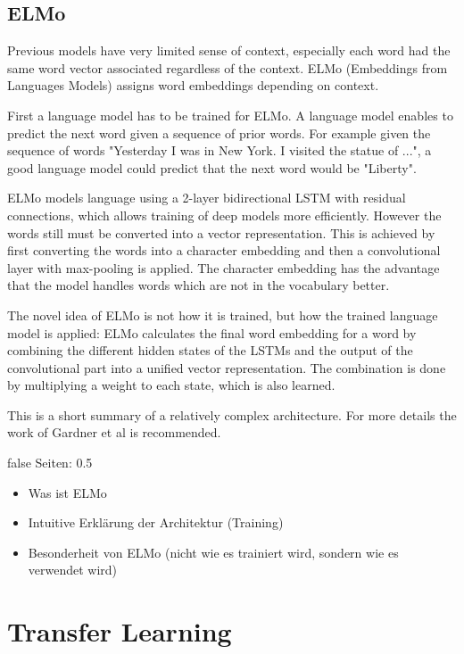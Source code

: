 \documentclass[draft,final,oneside]{vutinfth} %
\begin{document}
\fi

\subsection{ELMo \cite{elmo}}
Previous models have very limited sense of context, especially each word had the same word vector associated regardless of the context. ELMo (Embeddings from Languages Models) assigns word embeddings depending on context.

First a language model has to be trained for ELMo. A language model enables to predict the next word given a sequence of prior words. For example given the sequence of words "Yesterday I was in New York. I visited the statue of ...", a good language model could predict that the next word would be "Liberty".

ELMo models language using a 2-layer bidirectional LSTM with residual connections, which allows training of deep models more efficiently. However the words still must be converted into a vector representation. This is achieved by first converting the words into a character embedding and then a convolutional layer with max-pooling is applied. The character embedding has the advantage that the model handles words which are not in the vocabulary better.

The novel idea of ELMo is not how it is trained, but how the trained language model is applied: ELMo calculates the final word embedding for a word by combining the different hidden states of the LSTMs and the output of the convolutional part into a unified vector representation. The combination is done by multiplying a weight to each state, which is also learned.

This is a short summary of a relatively complex architecture. For more details the work of Gardner et al is recommended. \cite{elmo}

\if false
Seiten: 0.5

\begin{itemize}
\item Was ist ELMo
\item Intuitive Erklärung der Architektur (Training)
\item Besonderheit von ELMo (nicht wie es trainiert wird, sondern wie es verwendet wird)
\end{itemize}

\fi


\section{Transfer Learning} \label{transferlearning}
\end{document}
